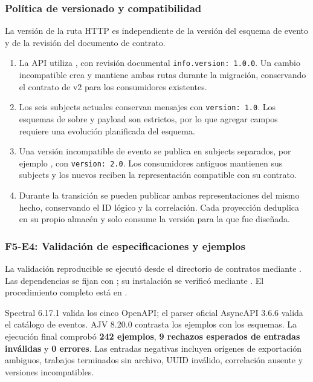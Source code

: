 \subsubsection{Política de versionado y compatibilidad}
La versión de la ruta HTTP es independiente de la versión del esquema de
evento y de la revisión del documento de contrato.
\begin{enumerate}[leftmargin=1.5em,itemsep=4pt]
\item La API utiliza , con revisión documental
\texttt{info.version: 1.0.0}. Un cambio incompatible crea  y
mantiene ambas rutas durante la migración, conservando el contrato de v2
para los consumidores existentes.
\item Los seis subjects actuales conservan mensajes con
\texttt{version: 1.0}. Los esquemas de sobre y payload son estrictos, por
lo que agregar campos requiere una evolución planificada del esquema.
\item Una versión incompatible de evento se publica en subjects separados,
por ejemplo , con
\texttt{version: 2.0}. Los consumidores antiguos mantienen sus subjects y
los nuevos reciben la representación compatible con su contrato.
\item Durante la transición se pueden publicar ambas representaciones del
mismo hecho, conservando el ID lógico y la correlación. Cada proyección
deduplica en su propio almacén y solo consume la versión para la que fue
diseñada.
\end{enumerate}

\subsubsection{F5-E4: Validación de especificaciones y ejemplos}
\label{sec:f5-a3-validacion}
La validación reproducible se ejecutó desde el directorio de contratos
mediante . Las dependencias se fijan con
; su instalación se verificó mediante
. El procedimiento
completo está en .

Spectral 6.17.1 valida los cinco OpenAPI; el parser oficial AsyncAPI 3.6.6
valida el catálogo de eventos. AJV 8.20.0 contrasta los ejemplos con los
esquemas. La ejecución final comprobó \textbf{242 ejemplos},
\textbf{9 rechazos esperados de entradas inválidas} y
\textbf{0 errores}. Las entradas negativas incluyen orígenes de
exportación ambiguos, trabajos terminados sin archivo, UUID inválido,
correlación ausente y versiones incompatibles.

